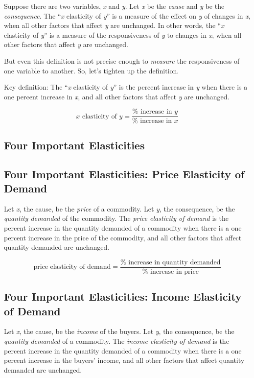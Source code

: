 \documentclass[
  letterpaper,
]{book}
\begin{document}
Suppose there are two variables, \emph{x} and \emph{y}. Let \emph{x} be
the \emph{cause} and \emph{y} be the \emph{consequence}. The ``\emph{x}
elasticity of \emph{y}'' is a measure of the effect on \emph{y} of
changes in \emph{x}, when all other factors that affect \emph{y} are
unchanged. In other words, the ``\emph{x} elasticity of \emph{y}'' is a
measure of the responsiveness of \emph{y} to changes in \emph{x}, when
all other factors that affect \emph{y} are unchanged.

But even this definition is not precise enough to \emph{measure} the
responsiveness of one variable to another. So, let's tighten up the
definition.

Key definition: The ``\emph{x} elasticity of \emph{y}'' is the percent
increase in \emph{y} when there is a one percent increase in \emph{x},
and all other factors that affect \emph{y} are unchanged.

\[
x \text{ elasticity of } y=\frac{\text{%
\]

\subsection{Four Important
Elasticities}\label{four-important-elasticities}

\subsection{Four Important Elasticities: Price Elasticity of
Demand}\label{four-important-elasticities-price-elasticity-of-demand}

Let \emph{x}, the cause, be the \emph{price} of a commodity. Let
\emph{y}, the consequence, be the \emph{quantity demanded} of the
commodity. The \emph{price elasticity of demand} is the percent increase
in the quantity demanded of a commodity when there is a one percent
increase in the price of the commodity, and all other factors that
affect quantity demanded are unchanged.

\[
\text{price elasticity of demand}=\frac{\text{%
\]

\subsection{Four Important Elasticities: Income Elasticity of
Demand}\label{four-important-elasticities-income-elasticity-of-demand}

Let \emph{x}, the cause, be the \emph{income} of the buyers. Let
\emph{y}, the consequence, be the \emph{quantity demanded} of a
commodity. The \emph{income elasticity of demand} is the percent
increase in the quantity demanded of a commodity when there is a one
percent increase in the buyers' income, and all other factors that
affect quantity demanded are unchanged.
\end{document}

